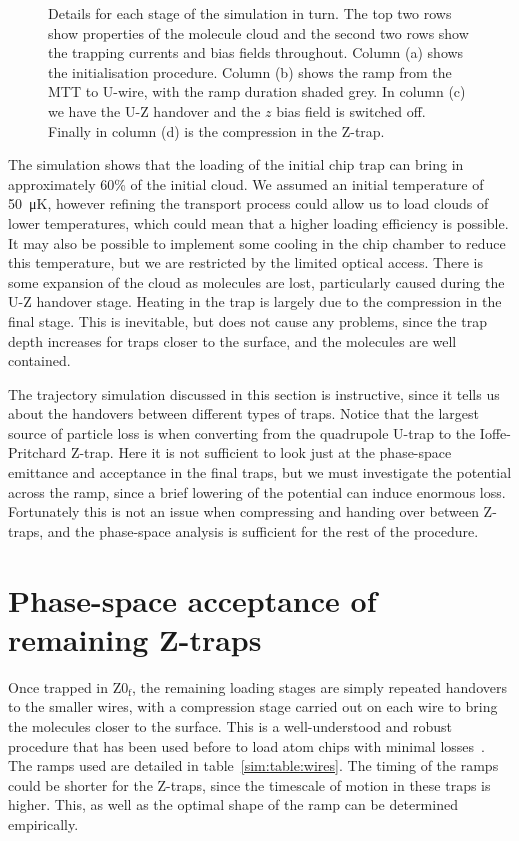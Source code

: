 \begin{figure}[p]
\centering
  \caption{
    Details for each stage of the simulation in turn. The top two rows show
    properties of the molecule cloud and the second two rows show the trapping
    currents and bias fields throughout. Column (a) shows the initialisation
    procedure. Column (b) shows the ramp from the MTT to U-wire, with the ramp
    duration shaded grey.  In column (c) we have the U-Z handover and the $z$
    bias field is switched off. Finally in column (d) is the compression in the
    Z-trap.
  }
  \label{sim:fig:simsum}
\end{figure}

The simulation shows that the loading of the initial chip trap can bring in
approximately 60\% of the initial cloud. We assumed an initial temperature of
\SI{50}{\micro\kelvin}, however refining the transport process could allow us
to load clouds of lower temperatures, which could mean that a higher loading
efficiency is possible. It may also be possible to implement some cooling in
the chip chamber to reduce this temperature, but we are restricted by the
limited optical access.
%
There is some expansion of the cloud as molecules are lost, particularly caused
during the U-Z handover stage.
%
Heating in the trap is largely due to the compression in the final stage. This
is inevitable, but does not cause any problems, since the trap depth
increases for traps closer to the surface, and the molecules are
well contained.

The trajectory simulation discussed in this section is instructive, since it
tells us about the handovers between different types of traps. Notice
that the largest source of particle loss is when converting from the quadrupole
U-trap to the Ioffe-Pritchard Z-trap. Here it is not sufficient to look just at
the phase-space emittance and acceptance in the final traps, but we must
investigate the potential across the ramp, since a brief lowering of the
potential can induce enormous loss. Fortunately this is not an issue when
compressing and handing over between Z-traps, and the phase-space analysis is
sufficient for the rest of the procedure.

\section{Phase-space acceptance of remaining Z-traps}
\label{sim:transferbetweenzs}

Once trapped in $\mathrm{Z0_f}$, the remaining loading stages are simply
repeated handovers to the smaller wires, with a compression stage carried out
on each wire to bring the molecules closer to the surface. This is a
well-understood and robust procedure that has been used before to load atom
chips with minimal losses~\cite{Reichel2002}. The ramps used are detailed in
table~\ref{sim:table:wires}.  The timing of the ramps could be shorter for
the Z-traps, since the timescale of motion in these traps is higher. This, as
well as the optimal shape of the ramp can be determined empirically.

